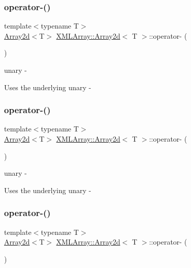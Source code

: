 \subsubsection{\texorpdfstring{operator-\/()}{operator-()}\hspace{0.1cm}{\footnotesize\ttfamily [1/3]}}
{\footnotesize\ttfamily template$<$typename T$>$ \\
\mbox{\hyperlink{classXMLArray_1_1Array2d}{Array2d}}$<$T$>$ \mbox{\hyperlink{classXMLArray_1_1Array2d}{X\+M\+L\+Array\+::\+Array2d}}$<$ T $>$\+::operator-\/ (\begin{DoxyParamCaption}{ }\end{DoxyParamCaption})\hspace{0.3cm}{\ttfamily [inline]}}



unary -\/ 

Uses the underlying unary -\/ \mbox{\label{classXMLArray_1_1Array2d_a650034573254ebdd7c914d68a498e2c9}} 
\subsubsection{\texorpdfstring{operator-\/()}{operator-()}\hspace{0.1cm}{\footnotesize\ttfamily [2/3]}}
{\footnotesize\ttfamily template$<$typename T$>$ \\
\mbox{\hyperlink{classXMLArray_1_1Array2d}{Array2d}}$<$T$>$ \mbox{\hyperlink{classXMLArray_1_1Array2d}{X\+M\+L\+Array\+::\+Array2d}}$<$ T $>$\+::operator-\/ (\begin{DoxyParamCaption}{ }\end{DoxyParamCaption})\hspace{0.3cm}{\ttfamily [inline]}}



unary -\/ 

Uses the underlying unary -\/ \mbox{\label{classXMLArray_1_1Array2d_a650034573254ebdd7c914d68a498e2c9}} 
\subsubsection{\texorpdfstring{operator-\/()}{operator-()}\hspace{0.1cm}{\footnotesize\ttfamily [3/3]}}
{\footnotesize\ttfamily template$<$typename T$>$ \\
\mbox{\hyperlink{classXMLArray_1_1Array2d}{Array2d}}$<$T$>$ \mbox{\hyperlink{classXMLArray_1_1Array2d}{X\+M\+L\+Array\+::\+Array2d}}$<$ T $>$\+::operator-\/ (\begin{DoxyParamCaption}{ }\end{DoxyParamCaption})\hspace{0.3cm}{\ttfamily [inline]}}



